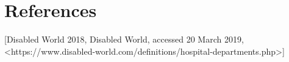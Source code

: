 \section{References}

\begin{thebibliography}{9}
 [Disabled World 2018, Disabled World, accessed 20 March 2019, <https://www.disabled-world.com/definitions/hospital-departments.php>]

\end{thebibliography}
